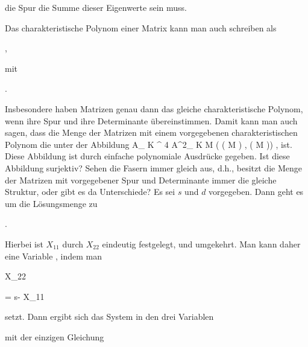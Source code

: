 {{{ \lambda
}


{ \neq }{ \delta
}


{  }{
}


{    }{
}


{   }{
}


}
{}{}{}
die Spur die Summe dieser Eigenwerte sein muss.


Das charakteristische Polynom einer Matrix kann man auch schreiben als


 { , }


mit


 { . }


Insbesondere haben Matrizen genau dann das gleiche charakteristische Polynom, wenn ihre Spur und ihre Determinante übereinstimmen. Damit kann man auch sagen, dass die Menge der Matrizen mit einem vorgegebenen charakteristischen Polynom die
unter der Abbildung
\maabbeledisp {} { { {\mathbb A}_{  K  }^{  4   } } } { {\mathbb A}^{2}_{ K }
} { M } {  (  \left(  M  \right)  , \det \left( M \right))
} {,}
ist. Diese Abbildung ist durch einfache polynomiale Ausdrücke gegeben. Ist diese Abbildung surjektiv? Sehen die Fasern immer gleich aus, d.h., besitzt die Menge der Matrizen mit vorgegebener Spur und Determinante immer die gleiche Struktur, oder gibt es da Unterschiede? Es sei $s$ und $d$ vorgegeben. Dann geht es um die Lösungsmenge zu


 { . }


Hierbei ist $X_{11}$ durch $X_{22}$ eindeutig festgelegt, und umgekehrt. Man kann daher eine Variable  {,} indem man


\mavergleichskette


{\vergleichskette


{ X_{22}
}


{ = }{ s- X_{11}
}


{  }{
}


{    }{
}


{   }{
}


}
{}{}{}
setzt. Dann ergibt sich das  System in den drei Variablen


 mit der einzigen Gleichung


}
